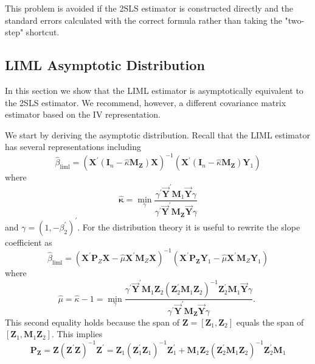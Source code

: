 \documentclass[10pt]{article}
\begin{document}
This problem is avoided if the 2SLS estimator is constructed directly and the standard errors calculated with the correct formula rather than taking the "two-step" shortcut.

\subsection{LIML Asymptotic Distribution}
In this section we show that the LIML estimator is asymptotically equivalent to the 2SLS estimator. We recommend, however, a different covariance matrix estimator based on the IV representation.

We start by deriving the asymptotic distribution. Recall that the LIML estimator has several representations including
$$
\widehat{\beta}_{\mathrm{liml}}=\left(\boldsymbol{X}^{\prime}\left(\boldsymbol{I}_{n}-\widehat{\kappa} \boldsymbol{M}_{\boldsymbol{Z}}\right) \boldsymbol{X}\right)^{-1}\left(\boldsymbol{X}^{\prime}\left(\boldsymbol{I}_{n}-\widehat{\kappa} \boldsymbol{M}_{\boldsymbol{Z}}\right) \boldsymbol{Y}_{1}\right)
$$
where
$$
\widehat{\boldsymbol{\kappa}}=\min _{\gamma} \frac{\gamma^{\prime} \overrightarrow{\boldsymbol{Y}}^{\prime} \boldsymbol{M}_{1} \overrightarrow{\boldsymbol{Y}} \gamma}{\gamma^{\prime} \overrightarrow{\boldsymbol{Y}}^{\prime} \boldsymbol{M}_{\boldsymbol{Z}} \overrightarrow{\boldsymbol{Y}} \gamma}
$$
and $\gamma=\left(1,-\beta_{2}^{\prime}\right)^{\prime}$. For the distribution theory it is useful to rewrite the slope coefficient as
$$
\widehat{\beta}_{\mathrm{liml}}=\left(\boldsymbol{X}^{\prime} \boldsymbol{P}_{Z} \boldsymbol{X}-\widehat{\mu} \boldsymbol{X}^{\prime} \boldsymbol{M}_{Z} \boldsymbol{X}\right)^{-1}\left(\boldsymbol{X}^{\prime} \boldsymbol{P}_{\boldsymbol{Z}} \boldsymbol{Y}_{1}-\widehat{\mu} \boldsymbol{X}^{\prime} \boldsymbol{M}_{Z} \boldsymbol{Y}_{1}\right)
$$
where
$$
\widehat{\mu}=\widehat{\kappa}-1=\min _{\gamma} \frac{\gamma^{\prime} \overrightarrow{\boldsymbol{Y}}^{\prime} \boldsymbol{M}_{1} \boldsymbol{Z}_{2}\left(\boldsymbol{Z}_{2}^{\prime} \boldsymbol{M}_{1} \boldsymbol{Z}_{2}\right)^{-1} \boldsymbol{Z}_{2}^{\prime} \boldsymbol{M}_{1} \overrightarrow{\boldsymbol{Y}} \gamma}{\gamma^{\prime} \overrightarrow{\boldsymbol{Y}}^{\prime} \boldsymbol{M}_{\boldsymbol{Z}} \overrightarrow{\boldsymbol{Y}} \gamma} \text {. }
$$
This second equality holds because the span of $\boldsymbol{Z}=\left[\boldsymbol{Z}_{1}, \boldsymbol{Z}_{2}\right]$ equals the span of $\left[\boldsymbol{Z}_{1}, \boldsymbol{M}_{1} \boldsymbol{Z}_{2}\right]$. This implies
$$
\boldsymbol{P}_{\boldsymbol{Z}}=\boldsymbol{Z}\left(\boldsymbol{Z}^{\prime} \boldsymbol{Z}\right)^{-1} \boldsymbol{Z}^{\prime}=\boldsymbol{Z}_{1}\left(\boldsymbol{Z}_{1}^{\prime} \boldsymbol{Z}_{1}\right)^{-1} \boldsymbol{Z}_{1}^{\prime}+\boldsymbol{M}_{1} \boldsymbol{Z}_{2}\left(\boldsymbol{Z}_{2}^{\prime} \boldsymbol{M}_{1} \boldsymbol{Z}_{2}\right)^{-1} \boldsymbol{Z}_{2}^{\prime} \boldsymbol{M}_{1}
$$
\end{document}
